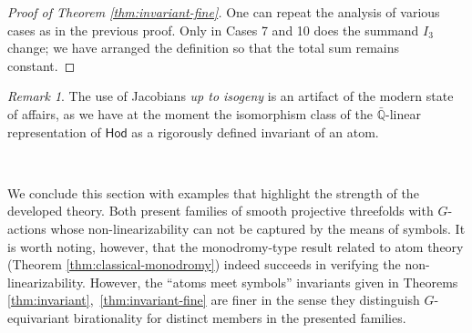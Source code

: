 \documentclass[12pt,a4paper]{amsart}
\theoremstyle{definition}
\theoremstyle{remark}
\newtheorem{remark}[theorem]{Remark}
\begin{document}
\begin{proof}[Proof of Theorem \ref{thm:invariant-fine}]
One can repeat the analysis of various cases as in the previous proof. Only in Cases 7 and 10 does the summand $I_3$ change; we have arranged the definition so that the total sum remains constant.
\end{proof}
\begin{remark}
    The use of Jacobians \textit{up to isogeny} is an artifact of the modern state of affairs, as we have at the moment the isomorphism class of the $\bar{\mathbb{Q}}$-linear representation of $\mathsf{Hod}$ as a rigorously defined invariant of an atom.
\end{remark}



\  


We conclude this section with examples that highlight the strength of the developed theory. Both present families of smooth projective threefolds with $G$-actions whose non-linearizability can not be captured by the means of symbols. It is worth noting, however, that the monodromy-type result related to atom theory (Theorem \ref{thm:classical-monodromy}) indeed succeeds in verifying the non-linearizability. However, the ``atoms meet symbols'' invariants given in Theorems \ref{thm:invariant},~\ref{thm:invariant-fine} are finer in the sense they distinguish $ G$-equivariant birationality for distinct members in the presented families.

\end{document}

